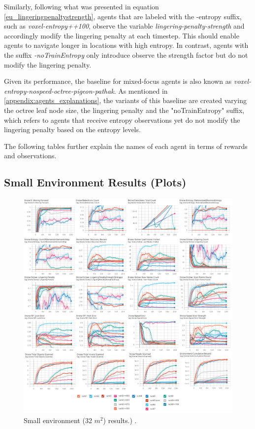 Similarly, following what was presented in equation \ref{eu_lingeringpenaltystrength}, agents that are labeled with the -entropy suffix, such as \textit{voxel-entropy++100}, observe the variable \textit{lingering-penalty-strength} and accordingly modify the lingering penalty at each timestep. This should enable agents to navigate longer in locations with high entropy. In contrast, agents with the suffix \textit{-noTrainEntropy} only introduce observe the strength factor but do not modify the lingering penalty. 

Given its performance, the baseline for mixed-focus agents is also known as \textit{voxel-entropy-nospeed-octree-pigeon-pathak}. 
As mentioned in \ref{appendix:agents_explanations}, the variants of this baseline are created varying the octree leaf node size, the lingering penalty and the "noTrainEntropy" suffix, which refers to agents that receive entropy observations yet do not modify the lingering penalty based on the entropy levels.

The following tables further explain the names of each agent in terms of rewards and observations.









\newpage


\subsection{Small Environment Results (Plots)}
\begin{figure}[!ht]
        \centering
        \includegraphics[width=1\textwidth]{images/results_baseAgent.png}
        \caption{Small environment (32 $m^2$) results.) .
        }
        \label{fig:results-small-env-performances}
\end{figure}

